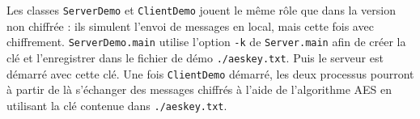 \documentclass[a4paper,12pt]{article}
\newcommand{\nopagenum}{\thispagestyle{empty}}
\newcommand{\code}[1]{\texttt{#1}}
\begin{document}
    Les classes \code{ServerDemo} et \code{ClientDemo} jouent le même rôle que dans la version non chiffrée : ils simulent l'envoi de messages en local, mais cette fois avec chiffrement. \code{ServerDemo.main} utilise l'option \code{-k} de \code{Server.main} afin de créer la clé et l'enregistrer dans le fichier de démo \code{./aeskey.txt}. Puis le serveur est démarré avec cette clé. Une fois \code{ClientDemo} démarré, les deux processus pourront à partir de là s'échanger des messages chiffrés à l'aide de l'algorithme AES en utilisant la clé contenue dans \code{./aeskey.txt}.
    
    \nopagenum
\end{document}
